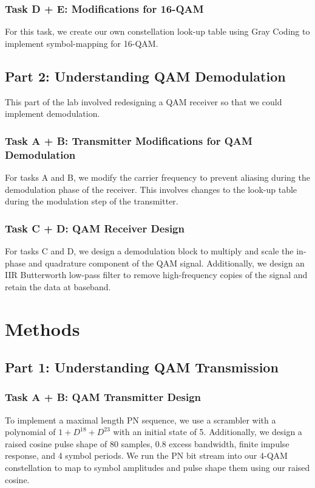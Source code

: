 \documentclass{article}
\begin{document}
\subsubsection{Task D + E: Modifications for 16-QAM}
For this task, we create our own constellation look-up table using Gray Coding to implement symbol-mapping for 16-QAM.

\subsection{Part 2: Understanding QAM Demodulation}
This part of the lab involved redesigning a QAM receiver so that we could implement demodulation.

\subsubsection{Task A + B: Transmitter Modifications for QAM Demodulation}
For tasks A and B, we modify the carrier frequency to prevent aliasing during the demodulation phase of the receiver. This involves changes to the look-up table during the modulation step of the transmitter.

\subsubsection{Task C + D: QAM Receiver Design}
For tasks C and D, we design a demodulation block to multiply and scale the in-phase and quadrature component of the QAM signal. Additionally, we design an IIR Butterworth low-pass filter to remove high-frequency copies of the signal and retain the data at baseband.


\section{Methods}

\subsection{Part 1: Understanding QAM Transmission}

\subsubsection{Task A + B: QAM Transmitter Design}
To implement a maximal length PN sequence, we use a scrambler with a polynomial of $ 1 + D^{18} + D^{23} $ with an initial state of 5. Additionally, we design a raised cosine pulse shape of 80 samples, 0.8 excess bandwidth, finite impulse response, and 4 symbol periods. We run the PN bit stream into our 4-QAM constellation to map to symbol amplitudes and pulse shape them using our raised cosine.
\end{document}
